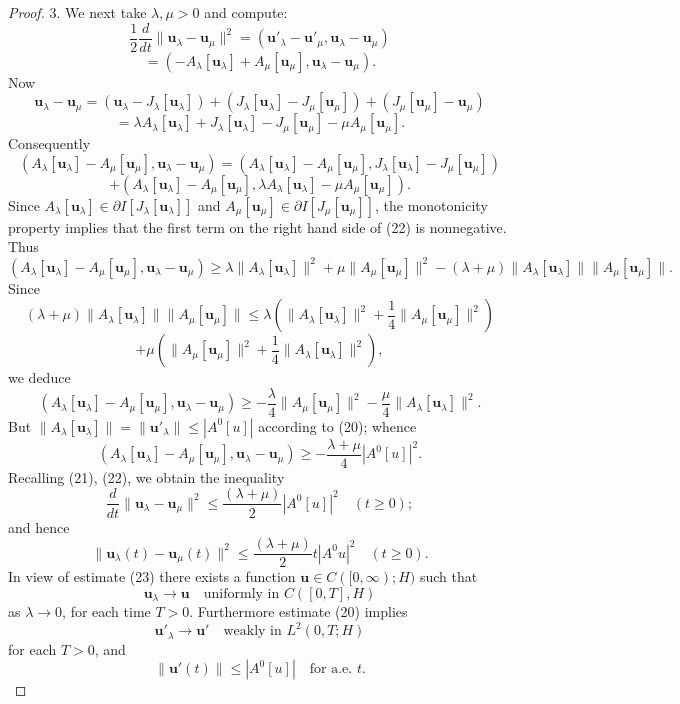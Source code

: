 \begin{proof}
3. We next take $\lambda, \mu > 0$ and compute:
\[
\frac{1}{2}\frac{d}{dt}\|\mathbf{u}_\lambda - \mathbf{u}_\mu\|^2 = (\mathbf{u}'_\lambda - \mathbf{u}'_\mu, \mathbf{u}_\lambda - \mathbf{u}_\mu)
\]
\[
= (-A_\lambda[\mathbf{u}_\lambda] + A_\mu[\mathbf{u}_\mu], \mathbf{u}_\lambda - \mathbf{u}_\mu).
\tag{21}
\]
Now
\[
\mathbf{u}_\lambda - \mathbf{u}_\mu = (\mathbf{u}_\lambda - J_\lambda[\mathbf{u}_\lambda]) + (J_\lambda[\mathbf{u}_\lambda] - J_\mu[\mathbf{u}_\mu]) + (J_\mu[\mathbf{u}_\mu] - \mathbf{u}_\mu)
\]
\[
= \lambda A_\lambda[\mathbf{u}_\lambda] + J_\lambda[\mathbf{u}_\lambda] - J_\mu[\mathbf{u}_\mu] - \mu A_\mu[\mathbf{u}_\mu].
\]
Consequently
\[
(A_\lambda[\mathbf{u}_\lambda] - A_\mu[\mathbf{u}_\mu], \mathbf{u}_\lambda - \mathbf{u}_\mu) = (A_\lambda[\mathbf{u}_\lambda] - A_\mu[\mathbf{u}_\mu], J_\lambda[\mathbf{u}_\lambda] - J_\mu[\mathbf{u}_\mu])
\]
\[
+ (A_\lambda[\mathbf{u}_\lambda] - A_\mu[\mathbf{u}_\mu], \lambda A_\lambda[\mathbf{u}_\lambda] - \mu A_\mu[\mathbf{u}_\mu]).
\tag{22}
\]
Since $A_\lambda[\mathbf{u}_\lambda] \in \partial I[J_\lambda[\mathbf{u}_\lambda]]$ and $A_\mu[\mathbf{u}_\mu] \in \partial I[J_\mu[\mathbf{u}_\mu]]$, the monotonicity property implies that the first term on the right hand side of (22) is nonnegative. Thus
\[
(A_\lambda[\mathbf{u}_\lambda] - A_\mu[\mathbf{u}_\mu], \mathbf{u}_\lambda - \mathbf{u}_\mu) \geq \lambda\|A_\lambda[\mathbf{u}_\lambda]\|^2 + \mu\|A_\mu[\mathbf{u}_\mu]\|^2 - (\lambda + \mu)\|A_\lambda[\mathbf{u}_\lambda]\| \|A_\mu[\mathbf{u}_\mu]\|.
\]
Since
\[
(\lambda + \mu)\|A_\lambda[\mathbf{u}_\lambda]\| \|A_\mu[\mathbf{u}_\mu]\| \leq \lambda\left(\|A_\lambda[\mathbf{u}_\lambda]\|^2 + \frac{1}{4}\|A_\mu[\mathbf{u}_\mu]\|^2\right)
\]
\[
+ \mu\left(\|A_\mu[\mathbf{u}_\mu]\|^2 + \frac{1}{4}\|A_\lambda[\mathbf{u}_\lambda]\|^2\right),
\]
we deduce
\[
(A_\lambda[\mathbf{u}_\lambda] - A_\mu[\mathbf{u}_\mu], \mathbf{u}_\lambda - \mathbf{u}_\mu) \geq -\frac{\lambda}{4}\|A_\mu[\mathbf{u}_\mu]\|^2 - \frac{\mu}{4}\|A_\lambda[\mathbf{u}_\lambda]\|^2.
\]
But $\|A_\lambda[\mathbf{u}_\lambda]\| = \|\mathbf{u}'_\lambda\| \leq |A^0[u]|$ according to (20); whence
\[
(A_\lambda[\mathbf{u}_\lambda] - A_\mu[\mathbf{u}_\mu], \mathbf{u}_\lambda - \mathbf{u}_\mu) \geq -\frac{\lambda + \mu}{4}|A^0[u]|^2.
\]
Recalling (21), (22), we obtain the inequality
\[
\frac{d}{dt}\|\mathbf{u}_\lambda - \mathbf{u}_\mu\|^2 \leq \frac{(\lambda + \mu)}{2}|A^0[u]|^2 \quad (t \geq 0);
\]
and hence
\[
\|\mathbf{u}_\lambda(t) - \mathbf{u}_\mu(t)\|^2 \leq \frac{(\lambda + \mu)}{2}t|A^0u|^2 \quad (t \geq 0).
\tag{23}
\]
In view of estimate (23) there exists a function $\mathbf{u} \in C([0, \infty); H)$ such that
\[
\mathbf{u}_\lambda \to \mathbf{u} \quad \text{uniformly in } C([0, T], H)
\]
as $\lambda \to 0$, for each time $T > 0$. Furthermore estimate (20) implies
\[
\mathbf{u}'_\lambda \to \mathbf{u}' \quad \text{weakly in } L^2(0, T; H)
\tag{24}
\]
for each $T > 0$, and
\[
\|\mathbf{u}'(t)\| \leq |A^0[u]| \quad \text{for a.e. } t.
\tag{25}
\]


\end{proof}
